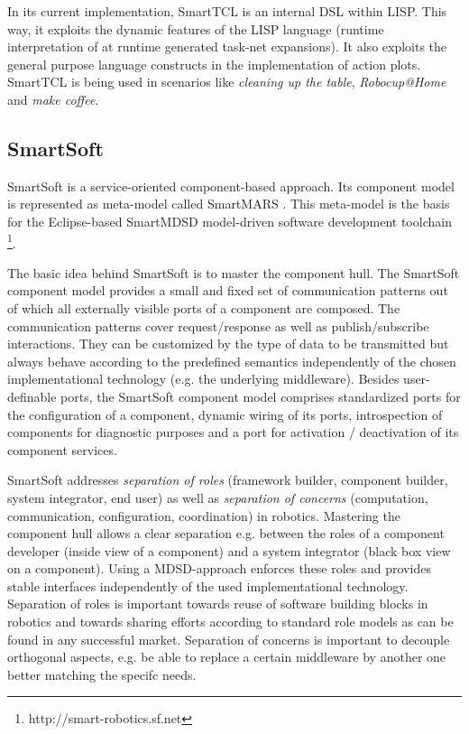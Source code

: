 \documentclass[jou]{apa}
\begin{document}
In its current implementation, {\sc SmartTCL} is an internal DSL within LISP. This way, it
exploits the dynamic features of the LISP language (runtime interpretation of at runtime generated
task-net expansions). It also exploits the general purpose language constructs in the implementation
of action plots. {\sc SmartTCL} is being used in scenarios like {\em cleaning up the table},
{\em Robocup@Home} and {\em make coffee}.

\subsection{SmartSoft}

{\sc SmartSoft} \cite{Schlegel:2006uq, Schlegel:2007kx} is a service-oriented 
component-based approach. Its component model is represented as meta-model 
called {\sc SmartMARS} \cite{Schlegel:2009fk}. This meta-model is the basis for 
the Eclipse-based {\sc SmartMDSD} model-driven software development toolchain
\footnote{http://smart-robotics.sf.net}.

The basic idea behind {\sc SmartSoft} is to master the component hull. The {\sc SmartSoft} 
component model provides a small and fixed set of communication patterns out of which all 
externally visible ports of a component are composed. The communication patterns cover 
request/response as well as publish/subscribe interactions. They can be customized by 
the type of data to be transmitted but always behave according to the predefined semantics
independently of the chosen implementational technology (e.g. the underlying middleware). 
Besides user-definable ports, the {\sc SmartSoft} component model comprises standardized 
ports for the configuration of a component, dynamic wiring of its ports, introspection of 
components for diagnostic purposes and a port for activation / deactivation of its component 
services.

{\sc SmartSoft} addresses {\em separation of roles} (framework builder, component builder, 
system integrator, end user) as well as {\em separation of concerns} (computation, communication,
configuration, coordination) in robotics. Mastering the component hull allows a clear separation 
e.g. between the roles of a component developer (inside view of a component) and a system integrator 
(black box view on a component). Using a MDSD-approach enforces these roles and provides stable 
interfaces independently of the used implementational technology. Separation of roles is important 
towards reuse of software building blocks in robotics and towards sharing efforts according to 
standard role models as can be found in any successful market. Separation of concerns is important
to decouple orthogonal aspects, e.g. be able to replace a certain middleware by another one better
matching the specifc needs.
\end{document}
